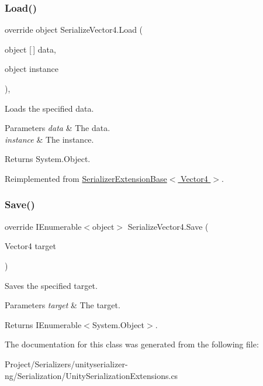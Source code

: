 \subsubsection{\texorpdfstring{Load()}{Load()}}
{\footnotesize\ttfamily override object Serialize\+Vector4.\+Load (\begin{DoxyParamCaption}\item[{object \mbox{[}$\,$\mbox{]}}]{data,  }\item[{object}]{instance }\end{DoxyParamCaption})\hspace{0.3cm}{\ttfamily [inline]}, {\ttfamily [virtual]}}



Loads the specified data. 


\begin{DoxyParams}{Parameters}
{\em data} & The data.\\
\hline
{\em instance} & The instance.\\
\hline
\end{DoxyParams}
\begin{DoxyReturn}{Returns}
System.\+Object.
\end{DoxyReturn}


Reimplemented from \hyperlink{class_serializer_extension_base_a3792a9b27056e30ca0ac91531936ae47}{Serializer\+Extension\+Base$<$ Vector4 $>$}.

\mbox{\label{class_serialize_vector4_a89b8effbb37fc428b4cc27a646eafe55}} 
\subsubsection{\texorpdfstring{Save()}{Save()}}
{\footnotesize\ttfamily override I\+Enumerable$<$object$>$ Serialize\+Vector4.\+Save (\begin{DoxyParamCaption}\item[{Vector4}]{target }\end{DoxyParamCaption})\hspace{0.3cm}{\ttfamily [inline]}}



Saves the specified target. 


\begin{DoxyParams}{Parameters}
{\em target} & The target.\\
\hline
\end{DoxyParams}
\begin{DoxyReturn}{Returns}
I\+Enumerable$<$System.\+Object$>$.
\end{DoxyReturn}


The documentation for this class was generated from the following file\+:\begin{DoxyCompactItemize}
\item 
Project/\+Serializers/unityserializer-\/ng/\+Serialization/Unity\+Serialization\+Extensions.\+cs\end{DoxyCompactItemize}
